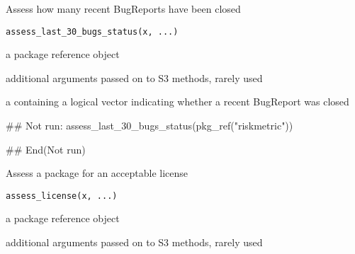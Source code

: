 \documentclass[a4paper]{book}
\begin{document}
%
\begin{Description}
Assess how many recent BugReports have been closed
\end{Description}
%
\begin{Usage}
\begin{verbatim}
assess_last_30_bugs_status(x, ...)
\end{verbatim}
\end{Usage}
%
\begin{Arguments}
\begin{ldescription}
\item[\code{x}] a  package reference object

\item[\code{...}] additional arguments passed on to S3 methods, rarely used
\end{ldescription}
\end{Arguments}
%
\begin{Value}
a  containing a logical vector indicating whether a recent BugReport was closed
\end{Value}
%
\begin{SeeAlso}
\end{SeeAlso}
%
\begin{Examples}
\begin{ExampleCode}
## Not run: 
assess_last_30_bugs_status(pkg_ref("riskmetric"))

## End(Not run)
\end{ExampleCode}
\end{Examples}
%
\begin{Description}
Assess a package for an acceptable license
\end{Description}
%
\begin{Usage}
\begin{verbatim}
assess_license(x, ...)
\end{verbatim}
\end{Usage}
%
\begin{Arguments}
\begin{ldescription}
\item[\code{x}] a  package reference object

\item[\code{...}] additional arguments passed on to S3 methods, rarely used
\end{ldescription}
\end{Arguments}
\end{document}
